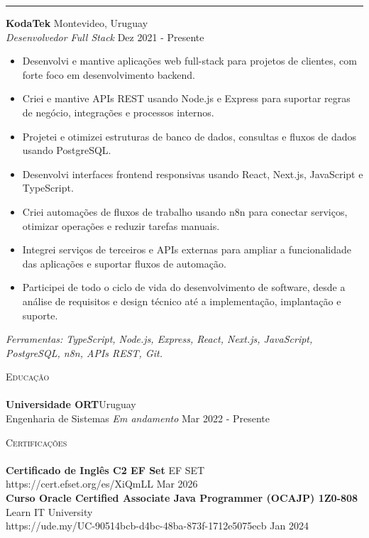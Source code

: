\documentclass[11pt,a4paper]{article}
\newcommand{\lineunder} {
    \vspace*{-8pt} \\
    \hspace*{-18pt} \hrulefill \\
}
\newcommand{\header} [1] {
    {\hspace*{-18pt}\vspace*{6pt} \textsc{#1}}
    \vspace*{-6pt} \lineunder
}
\begin{document}
\vspace{1.5mm}
\hrule
\vspace{1.5mm}

\textbf{KodaTek} \hfill Montevideo, Uruguay\\
\textit{Desenvolvedor Full Stack} \hfill Dez 2021 - Presente\\
\vspace{-1mm}
\begin{itemize} \itemsep -1pt
	\item Desenvolvi e mantive aplicações web full-stack para projetos de clientes, com forte foco em desenvolvimento backend.
	\item Criei e mantive APIs REST usando Node.js e Express para suportar regras de negócio, integrações e processos internos.
	\item Projetei e otimizei estruturas de banco de dados, consultas e fluxos de dados usando PostgreSQL.
	\item Desenvolvi interfaces frontend responsivas usando React, Next.js, JavaScript e TypeScript.
	\item Criei automações de fluxos de trabalho usando n8n para conectar serviços, otimizar operações e reduzir tarefas manuais.
	\item Integrei serviços de terceiros e APIs externas para ampliar a funcionalidade das aplicações e suportar fluxos de automação.
	\item Participei de todo o ciclo de vida do desenvolvimento de software, desde a análise de requisitos e design técnico até a implementação, implantação e suporte.
\end{itemize}
\vspace{-1mm}
\textit{Ferramentas: TypeScript, Node.js, Express, React, Next.js, JavaScript, PostgreSQL, n8n, APIs REST, Git.}
\vspace{1.5mm}

\header{Educação}
\textbf{Universidade ORT}\hfill Uruguay\\
Engenharia de Sistemas \textit{Em andamento} \hfill Mar 2022 - Presente\\
\vspace{1.5mm}





\header{Certificações}
\textbf{Certificado de Inglês C2 EF Set} \hfill EF SET\\
https://cert.efset.org/es/XiQmLL \hfill Mar 2026\\
\vspace*{1mm}
\textbf{Curso Oracle Certified Associate Java Programmer (OCAJP) 1Z0-808} \hfill Learn IT University\\
https://ude.my/UC-90514bcb-d4bc-48ba-873f-1712e5075ecb \hfill Jan 2024\\
\vspace*{1mm}

\ 
\end{document}
